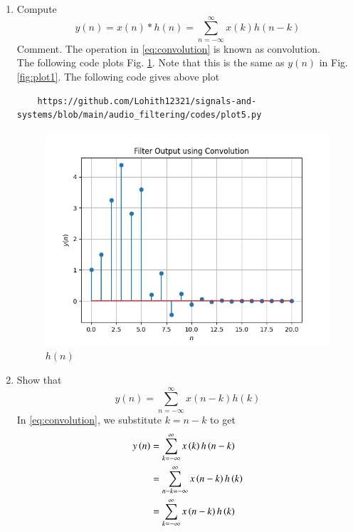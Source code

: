 \documentclass[journal,12pt,twocolumn]{IEEEtran}
\theoremstyle{remark}
\begin{document}
\begin{enumerate}[label=\thesection.\arabic*
,ref=\thesection.\theenumi]
\begin{enumerate}[label=\thesection.\arabic*
,ref=\thesection.\theenumi]
\begin{enumerate}[label=\thesection.\arabic*
,ref=\thesection.\theenumi]
\item Compute 
%
\begin{equation}
\label{eq:convolution}
y(n) = x(n)*h(n) = \sum_{n=-\infty}^{\infty}x(k)h(n-k)
\end{equation}
%
Comment. The operation in \eqref{eq:convolution} is known as
convolution.
%
\\
\solution The following code plots Fig. \ref{fig:plot5}. Note that this is the same as 
$y(n)$ in  Fig. \ref{fig:plot1}. 
The following code gives above plot
\begin{lstlisting}
    https://github.com/Lohith12321/signals-and-systems/blob/main/audio_filtering/codes/plot5.py
\end{lstlisting}
\begin{figure}[ht]
    \centering  
\includegraphics[width=\columnwidth]{figs/plot5.png}
\begin{center}
    \caption{$h(n)$}
\end{center}
    \label{fig:}
    \label{fig:plot5}
\end{figure}
\item Show that
\begin{equation}
y(n) =  \sum_{n=-\infty}^{\infty}x(n-k)h(k)
\end{equation}
\solution
In \eqref{eq:convolution}, we substitute $k = n - k$ to get
\begin{align}
y\left(n\right) &= \sum_{k=-\infty}^{\infty}x\left(k\right)h\left(n - k\right) \\
		  &= \sum_{n - k=-\infty}^{\infty}x\left(n - k\right)h\left(k\right) \\
		  &= \sum_{k=-\infty}^{\infty}x\left(n - k\right)h\left(k\right)
\end{align}
\end{enumerate}
\begin{enumerate}[label=\thesection.\arabic*
,ref=\thesection.\theenumi]

\end{enumerate}
\end{enumerate}
\end{enumerate}
\end{document}
